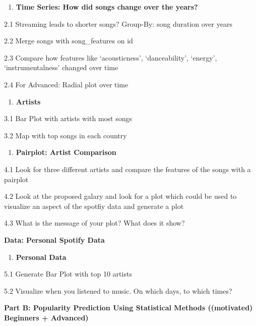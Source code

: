 \documentclass[
  11pt,
]{book}
\providecommand{\tightlist}{%
  \setlength{\itemsep}{0pt}\setlength{\parskip}{0pt}}
\begin{document}
\begin{enumerate}
\def\labelenumi{\arabic{enumi}.}
\setcounter{enumi}{1}
\tightlist
\item
  \textbf{Time Series: How did songs change over the years?}
\end{enumerate}

2.1 Streaming leads to shorter songs? Group-By: song duration over years

2.2 Merge songs with song\_features on id

2.3 Compare how features like `acousticness', `danceability', `energy', `instrumentalness' changed over time

2.4 For Advanced: Radial plot over time

\begin{enumerate}
\def\labelenumi{\arabic{enumi}.}
\setcounter{enumi}{2}
\tightlist
\item
  \textbf{Artists}
\end{enumerate}

3.1 Bar Plot with artists with most songs

3.2 Map with top songs in each country

\begin{enumerate}
\def\labelenumi{\arabic{enumi}.}
\setcounter{enumi}{3}
\tightlist
\item
  \textbf{Pairplot: Artist Comparison}
\end{enumerate}

4.1 Look for three different artists and compare the features of the songs with a pairplot

4.2 Look at the proposed galary and look for a plot which could be used to visualize an aspect of the spotfiy data and generate a plot

4.3 What is the message of your plot? What does it show?

\textbf{Data: Personal Spotify Data}

\begin{enumerate}
\def\labelenumi{\arabic{enumi}.}
\setcounter{enumi}{4}
\tightlist
\item
  \textbf{Personal Data}
\end{enumerate}

5.1 Generate Bar Plot with top 10 artists

5.2 Visualize when you listened to music. On which days, to which times?

\textbf{Part B: Popularity Prediction Using Statistical Methods ((motivated) Beginners + Advanced)}
\end{document}
